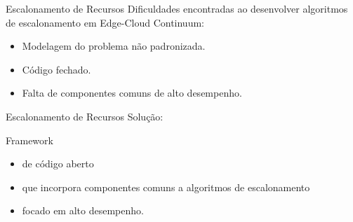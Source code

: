 \begin{frame}{Escalonamento de Recursos}
    Dificuldades encontradas ao desenvolver algoritmos de escalonamento em Edge-Cloud Continuum:
    \begin{itemize}
        \item Modelagem do problema não padronizada.
        \item Código fechado.
        \item Falta de componentes comuns de alto desempenho.
    \end{itemize}
\end{frame}

\begin{frame}{Escalonamento de Recursos}
    Solução:

    Framework
    \begin{itemize}
        \item[] de código aberto
        \item[] que incorpora componentes comuns a algoritmos de escalonamento
        \item[] focado em alto desempenho.
    \end{itemize}
\end{frame}